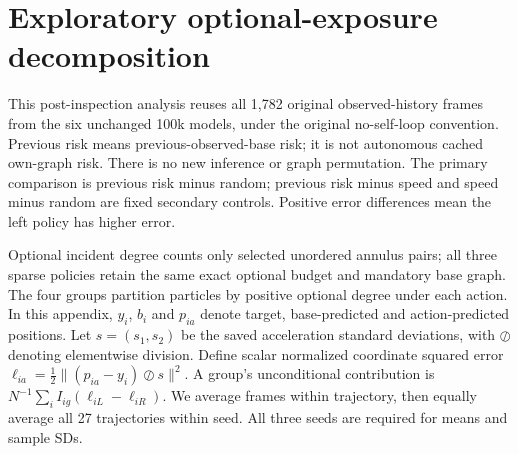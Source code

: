 \section{Exploratory optional-exposure decomposition}
\label{sec:optional-exposure}
This post-inspection analysis reuses all 1,782 original observed-history frames
from the six unchanged 100k models, under the original no-self-loop convention.
Previous risk means previous-observed-base risk; it is not autonomous cached
own-graph risk. There is no new inference or graph permutation. The primary
comparison is previous risk minus random; previous risk minus speed and speed
minus random are fixed secondary controls. Positive error differences mean
the left policy has higher error.

Optional incident degree counts only selected unordered annulus pairs; all
three sparse policies retain the same exact optional budget and mandatory
base graph. The four groups partition particles by positive optional degree
under each action. In this appendix, $y_i$, $b_i$ and $p_{ia}$ denote target,
base-predicted and action-predicted positions. Let $s=(s_1,s_2)$ be the saved
acceleration standard deviations, with $\oslash$ denoting elementwise
division. Define scalar normalized coordinate squared error
$\ell_{ia}=\tfrac12\|(p_{ia}-y_i)\oslash s\|^2$.
A group's unconditional contribution is
$N^{-1}\sum_i I_{ig}(\ell_{iL}-\ell_{iR})$.
We average frames within trajectory, then equally average all 27 trajectories
within seed. All three seeds are required for means and sample SDs.

